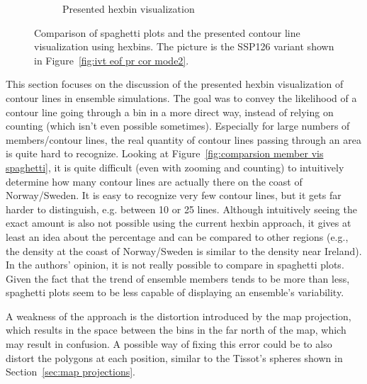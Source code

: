 \begin{figure}[!htb]
\begin{subfigure}[b]{0.51\textwidth}
    \caption{Presented hexbin visualization}
    \label{fig:comparsion member vis hexbin}
  \end{subfigure}
  \caption[Comparison of Ensemble Hexbin and Spaghetti Plots Visualizations]{Comparison of spaghetti plots and the presented contour line visualization using hexbins. The picture is the SSP126 variant shown in Figure~\ref{fig:ivt eof pr cor mode2}.}
    \label{fig:comparsion member vis}
\end{figure}

This section focuses on the discussion of the presented hexbin visualization of contour lines in ensemble simulations. 
The goal was to convey the likelihood of a contour line going through a bin in a more direct way, instead of relying on counting (which isn't even possible sometimes). 
Especially for large numbers of members/contour lines, the real quantity of contour lines passing through an area is quite hard to recognize. 
Looking at Figure~\ref{fig:comparsion member vis spaghetti}, it is quite difficult (even with zooming and counting) to intuitively determine how many contour lines are actually there on the coast of Norway/Sweden. 
It is easy to recognize very few contour lines, but it gets far harder to distinguish, e.g. between 10 or 25 lines. 
Although intuitively seeing the exact amount is also not possible using the current hexbin approach, it gives at least an idea about the percentage and can be compared to other regions (e.g., the density at the coast of Norway/Sweden is similar to the density near Ireland). 
In the authors' opinion, it is not really possible to compare in spaghetti plots. 
Given the fact that the trend of ensemble members tends to be more than less, spaghetti plots seem to be less capable of displaying an ensemble's variability. 




A weakness of the approach is the distortion introduced by the map projection, which results in the space between the bins in the far north of the map, which may result in confusion. 
A possible way of fixing this error could be to also distort the polygons at each position, similar to the Tissot's spheres shown in Section~\ref{sec:map projections}. 


